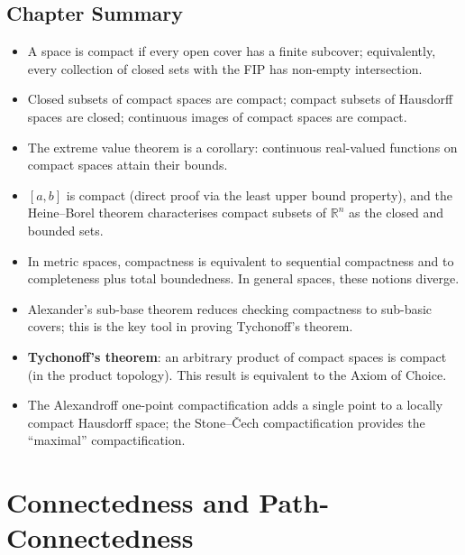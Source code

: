 \documentclass[11pt,a4paper,twoside]{book}
\theoremstyle{remark}
\theoremstyle{definition}
\theoremstyle{definition}
\begin{document}
\section{Chapter Summary}
\label{sec:compactness-summary}

\begin{itemize}
\item A space is compact if every open cover has a finite subcover;
  equivalently, every collection of closed sets with the FIP has non-empty
  intersection.
\item Closed subsets of compact spaces are compact; compact subsets of
  Hausdorff spaces are closed; continuous images of compact spaces are compact.
\item The extreme value theorem is a corollary: continuous real-valued functions
  on compact spaces attain their bounds.
\item $[a,b]$ is compact (direct proof via the least upper bound property),
  and the Heine--Borel theorem characterises compact subsets of $\mathbb{R}^n$
  as the closed and bounded sets.
\item In metric spaces, compactness is equivalent to sequential compactness and
  to completeness plus total boundedness.  In general spaces, these notions
  diverge.
\item Alexander's sub-base theorem reduces checking compactness to sub-basic
  covers; this is the key tool in proving Tychonoff's theorem.
\item \textbf{Tychonoff's theorem}: an arbitrary product of compact spaces is
  compact (in the product topology).  This result is equivalent to the Axiom
  of Choice.
\item The Alexandroff one-point compactification adds a single point to a
  locally compact Hausdorff space; the Stone--\v{C}ech compactification
  provides the ``maximal'' compactification.
\end{itemize}


\chapter{Connectedness and Path-Connectedness}\label{ch:connectedness}
\end{document}
